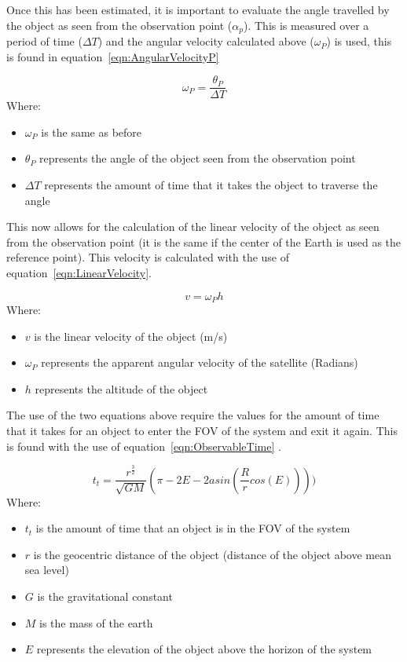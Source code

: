 \documentclass[11pt]{witseiepaper}
\begin{document}
Once this has been estimated, it is important to evaluate the angle travelled by the object as seen from the observation point ($\alpha_{p}$). This is measured over a period of time ($\Delta T$) and the angular velocity calculated above ($\omega_{P}$) is used, this is found in equation~\ref{eqn:AngularVelocityP}

\begin{equation} \label{eqn:AngularVelocityP}
    \omega_{P} = \frac{\theta_{P}}{\Delta T}
\end{equation}
Where:
\begin{itemize}
    \item $\omega_{P}$ is the same as before
    \item $\theta_{P}$ represents the angle of the object seen from the observation point
    \item $\Delta T$ represents the amount of time that it takes the object to traverse the angle
\end{itemize}

This now allows for the calculation of the linear velocity of the object as seen from the observation point (it is the same if the center of the Earth is used as the reference point). This velocity is calculated with the use of equation~\ref{eqn:LinearVelocity}.

\begin{equation} \label{eqn:LinearVelocity}
    v = \omega_{P} h
\end{equation}
Where:
\begin{itemize}
    \item $v$ is the linear velocity of the object (m/s)
    \item $\omega_{P}$ represents the apparent angular velocity of the satellite (Radians)
    \item $h$ represents the altitude of the object
\end{itemize}


The use of the two equations above require the values for the amount of time that it takes for an object to enter the FOV of the system and exit it again. This is found with the use of equation~\ref{eqn:ObservableTime} \cite{ObservableTime}.

\begin{equation} \label{eqn:ObservableTime}
    t_{t} = \frac{r^{\frac{3}{2}}}{\sqrt{GM}} (\pi - 2E - 2 asin(\frac{R}{r} cos(E))))
\end{equation}
Where:
\begin{itemize}
    \item $t_{t}$ is the amount of time that an object is in the FOV of the system
    \item $r$ is the geocentric distance of the object (distance of the object above mean sea level)
    \item $G$ is the gravitational constant
    \item $M$ is the mass of the earth
    \item $E$ represents the elevation of the object above the horizon of the system
\end{itemize}
\end{document}
